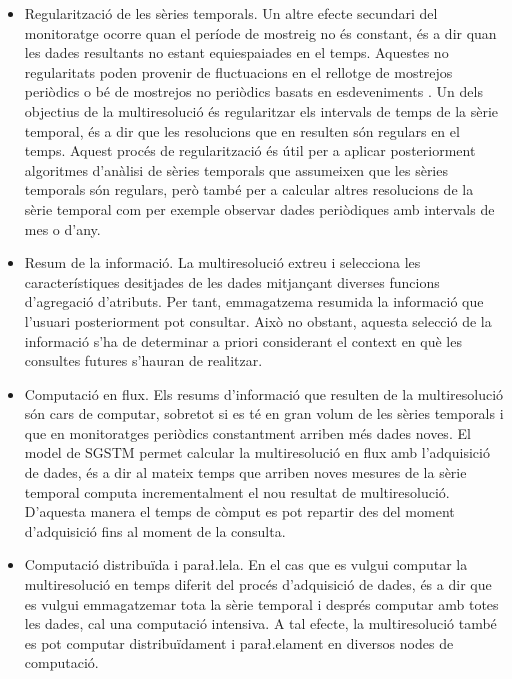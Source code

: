 \begin{itemize}
\item Regularització de les sèries temporals. Un altre efecte
  secundari del monitoratge ocorre quan el període de mostreig no és
  constant, és a dir quan les dades resultants no estant equiespaiades
  en el temps. Aquestes no regularitats poden provenir de fluctuacions
  en el rellotge de mostrejos periòdics o bé de mostrejos no periòdics
  basats en esdeveniments \parencite{kopetz11:realtime}. Un dels
  objectius de la multiresolució és regularitzar els intervals de
  temps de la sèrie temporal, és a dir que les resolucions que en
  resulten són regulars en el temps. Aquest procés de regularització
  és útil per a aplicar posteriorment algoritmes d'anàlisi de sèries
  temporals que assumeixen que les sèries temporals són regulars, però
  també per a calcular altres resolucions de la sèrie temporal com per
  exemple observar dades periòdiques amb intervals de mes o d'any.


\item Resum de la informació.  La multiresolució extreu i selecciona
  les característiques desitjades de les dades mitjançant diverses
  funcions d'agregació d'atributs. Per tant, emmagatzema resumida la
  informació que l'usuari posteriorment pot consultar. Això no
  obstant, aquesta selecció de la informació s'ha de determinar a
  priori considerant el context en què les consultes futures s'hauran
  de realitzar.


\item Computació en flux. Els resums d'informació que
  resulten de la multiresolució són cars de computar, sobretot si es
  té en gran volum de les sèries temporals i que en monitoratges
  periòdics constantment arriben més dades noves. El
  model de \gls{SGSTM} permet calcular la multiresolució en flux amb
  l'adquisició de dades, és a dir al mateix temps que arriben noves
  mesures de la sèrie temporal computa incrementalment el nou resultat
  de multiresolució. D'aquesta manera el temps de còmput es pot
  repartir des del moment d'adquisició fins al moment de la consulta.

\item Computació distribuïda i para\l.lela. En el cas que es vulgui
  computar la multiresolució en temps diferit del procés d'adquisició
  de dades, és a dir que es vulgui emmagatzemar tota la sèrie temporal
  i després computar amb totes les dades, cal una computació
  intensiva. A tal efecte, la multiresolució també es pot computar
  distribuïdament i para\l.elament en diversos nodes de computació.

 
\end{itemize}


